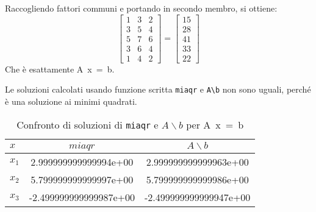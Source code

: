 Raccogliendo fattori communi e portando in secondo membro, si ottiene:
\[
   \begin{bmatrix}
      1 & 3 & 2 \\
      3 & 5 & 4 \\
      5 & 7 & 6 \\
      3 & 6 & 4 \\
      1 & 4 & 2
   \end{bmatrix}
   =
   \begin{bmatrix}
      15 \\
      28 \\
      41 \\
      33 \\
      22
   \end{bmatrix}
\]
Che è esattamente \mbox{A x = b}.

Le soluzioni calcolati usando funzione scritta \lstinline{miaqr} e \lstinline{A\b}
non sono uguali, perché è una soluzione ai minimi quadrati.
\begin{table}[ht]
   \centering
   \renewcommand\arraystretch{2}
   \begin{tabular}{| l | c c |}
      \hline
      $x$     & $miaqr$                & $A \backslash b$       \\
      \hline
      $x_{1}$ & 2.999999999999994e+00  & 2.999999999999963e+00  \\
      $x_{2}$ & 5.799999999999997e+00  & 5.799999999999986e+00  \\
      $x_{3}$ & -2.499999999999987e+00 & -2.499999999999947e+00 \\
      \hline
   \end{tabular}
   \caption{Confronto di soluzioni di \lstinline{miaqr} e $A \backslash b$ per \mbox{A x = b}}
   \label{tab:13_2}
\end{table}
\FloatBarrier
